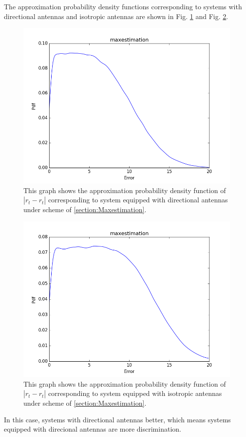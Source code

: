 	The approximation probability density functions corresponding to systems with directional antennas and isotropic antennas are shown in Fig. \ref{figure: maxdirex} and Fig. \ref{figure: maxomniex}.
	\begin{figure}[]
		\centering
		\includegraphics[scale=0.5]{Figures/maxdirex.png}
		\caption{This graph shows the approximation probability density function of $|r_{t}-\hat{r_{t}}|$ corresponding to system equipped with directional antennas under scheme of \ref{section:Maxestimation}. }
		\label{figure: maxdirex}
	\end{figure}
	\begin{figure}[]
		\centering
		\includegraphics[scale=0.5]{Figures/maxomniex.png}
		\caption{This graph shows the approximation probability density function of $|r_{t}-\hat{r_{t}}|$ corresponding to system equipped with isotropic antennas under scheme of \ref{section:Maxestimation}. }
		\label{figure: maxomniex}
	\end{figure}
In this case, systems with directional antennas better, which means systems equipped with direcional antennas are more discrimination.
